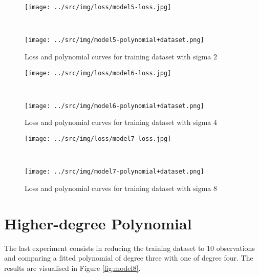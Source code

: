 \documentclass[a4paper,12pt]{article} %
\begin{document}
	\begin{figure}[H]
		\begin{minipage}[c]{.49\textwidth}
			\centering
			\texttt{[image: ../src/img/loss/model5-loss.jpg]}
		\end{minipage}
		~
		\begin{minipage}[c]{.49\textwidth}
			\centering
			\texttt{[image: ../src/img/model5-polynomial+dataset.png]}
		\end{minipage}
		\caption{Loss and polynomial curves for training dataset with sigma $2$}
	\end{figure}
	
	\begin{figure}[H]
		\begin{minipage}[c]{.49\textwidth}
			\centering
			\texttt{[image: ../src/img/loss/model6-loss.jpg]}
		\end{minipage}
		~
		\begin{minipage}[c]{.49\textwidth}
			\centering
			\texttt{[image: ../src/img/model6-polynomial+dataset.png]}
		\end{minipage}
	\caption{Loss and polynomial curves for training dataset with sigma $4$}
	\end{figure}
	
	\begin{figure}[H]
		\begin{minipage}[c]{.49\textwidth}
			\centering
			\texttt{[image: ../src/img/loss/model7-loss.jpg]}
		\end{minipage}
		~
		\begin{minipage}[c]{.49\textwidth}
			\centering
			\texttt{[image: ../src/img/model7-polynomial+dataset.png]}
		\end{minipage}
	\caption{Loss and polynomial curves for training dataset with sigma $8$}
	\end{figure}
	
	
	\section{Higher-degree Polynomial}
	The last experiment consists in reducing the training dataset to $10$ 
	observations and comparing a fitted polynomial of degree three with 
	one of degree four.
	The results are visualised in Figure \ref*{fig:model8}.
	
\end{document}

